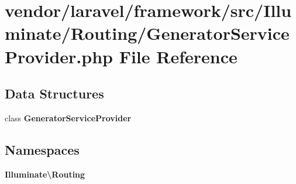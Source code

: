\section{vendor/laravel/framework/src/\+Illuminate/\+Routing/\+Generator\+Service\+Provider.php File Reference}
\label{_routing_2_generator_service_provider_8php}
\subsection*{Data Structures}
\begin{DoxyCompactItemize}
\item 
class {\bf Generator\+Service\+Provider}
\end{DoxyCompactItemize}
\subsection*{Namespaces}
\begin{DoxyCompactItemize}
\item 
 {\bf Illuminate\textbackslash{}\+Routing}
\end{DoxyCompactItemize}
